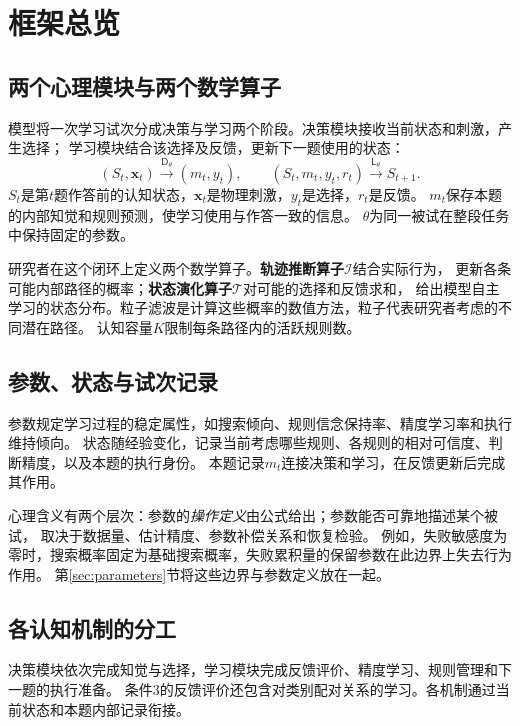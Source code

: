 \documentclass[11pt,a4paper]{article}
\numberwithin{equation}{section}
\newcommand{\Dd}{\mathsf{D}}
\newcommand{\Ll}{\mathsf{L}}
\newcommand{\Ii}{\mathcal{I}}
\newcommand{\Tt}{\mathcal{T}}
\begin{document}
\clearpage
{\small\setlength{\parskip}{0pt}\tableofcontents}
\clearpage

\section{框架总览}
\label{sec:overview}

\subsection{两个心理模块与两个数学算子}
模型将一次学习试次分成决策与学习两个阶段。决策模块接收当前状态和刺激，产生选择；
学习模块结合该选择及反馈，更新下一题使用的状态：
\begin{equation}
(S_t,\bm x_t)\xrightarrow{\Dd_\theta}(m_t,y_t),\qquad
(S_t,m_t,y_t,r_t)\xrightarrow{\Ll_\theta}S_{t+1}.
\label{eq:loop}
\end{equation}
$S_t$是第$t$题作答前的认知状态，$\bm x_t$是物理刺激，$y_t$是选择，$r_t$是反馈。
$m_t$保存本题的内部知觉和规则预测，使学习使用与作答一致的信息。
$\theta$为同一被试在整段任务中保持固定的参数。

研究者在这个闭环上定义两个数学算子。\textbf{轨迹推断算子}$\Ii$结合实际行为，
更新各条可能内部路径的概率；\textbf{状态演化算子}$\Tt$对可能的选择和反馈求和，
给出模型自主学习的状态分布。粒子滤波是计算这些概率的数值方法，粒子代表研究者考虑的不同潜在路径。
认知容量$K$限制每条路径内的活跃规则数。

\subsection{参数、状态与试次记录}
参数规定学习过程的稳定属性，如搜索倾向、规则信念保持率、精度学习率和执行维持倾向。
状态随经验变化，记录当前考虑哪些规则、各规则的相对可信度、判断精度，以及本题的执行身份。
本题记录$m_t$连接决策和学习，在反馈更新后完成其作用。

心理含义有两个层次：参数的\emph{操作定义}由公式给出；参数能否可靠地描述某个被试，
取决于数据量、估计精度、参数补偿关系和恢复检验。
例如，失败敏感度为零时，搜索概率固定为基础搜索概率，失败累积量的保留参数在此边界上失去行为作用。
第\ref{sec:parameters}节将这些边界与参数定义放在一起。

\subsection{各认知机制的分工}
决策模块依次完成知觉与选择，学习模块完成反馈评价、精度学习、规则管理和下一题的执行准备。
条件3的反馈评价还包含对类别配对关系的学习。各机制通过当前状态和本题内部记录衔接。
\end{document}
